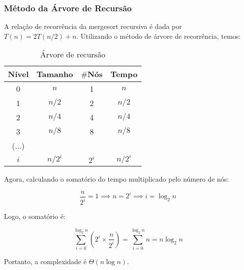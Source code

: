 \subsubsection{Método da Árvore de Recursão}
A relação de recorrência da mergesort recursiva é dada por $T(n) = 2T(n/2) + n$. Utilizando o método de árvore de recorrência, temos:

\begin{table}[ht!]
    \centering
    \begin{tabular}{|c|c|c|c|}
    \hline
    \textbf{Nível} & \textbf{Tamanho} & $\#$\textbf{Nós} & \textbf{Tempo} \\ \hline
     0 & $n$ & 1 & $n$ \\ \hline
     1 & $n/2$ & 2 & $n/2$ \\ \hline
     2 & $n/4$ & 4 & $n/4$ \\ \hline
     3 & $n/8$ & 8 & $n/8$ \\ \hline
     (...) & & & \\ \hline
     $i$ & $n/2^i$ & $2^i$ & $n/2^i$ \\ \hline 
    \end{tabular}  
    \caption{Árvore de recursão}
\end{table}

Agora, calculando o somatório do tempo multiplicado pelo número de nós:

\[
\frac{n}{2^i} = 1 \implies n = 2^i \implies i = \log_2{n}
\]

Logo, o somatório é:

\[
\sum_{i=0}^{\log_2{n}} \left( 2^i \times \frac{n}{2^i} \right) = \sum_{i=0}^{\log_2{n}} n = n \log_2{n}
\]

Portanto, a complexidade é $\Theta(n \log n)$.
